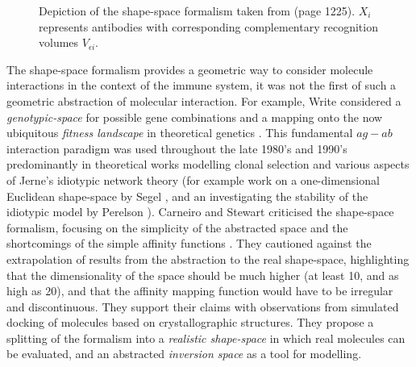 \begin{figure}[ht]
	\centering
	\caption{Depiction of the shape-space formalism taken from \cite{Perelson1997} (page 1225). $X_{i}$ represents antibodies with corresponding complementary recognition volumes $V_{\epsilon i}$.}
	\label{pic:theory:shapespace}
\end{figure}

The shape-space formalism provides a geometric way to consider molecule interactions in the context of the immune system, it was not the first of such a geometric abstraction of molecular interaction. For example, Write considered a \emph{genotypic-space} for possible gene combinations and a mapping onto the now ubiquitous \emph{fitness landscape} in theoretical genetics \cite{Wright1932}. 
This fundamental $ag-ab$ interaction paradigm was used throughout the late 1980's and 1990's predominantly in theoretical works modelling clonal selection and various aspects of Jerne's idiotypic network theory (for example work on a one-dimensional Euclidean shape-space by Segel \cite{Segel1988}, and an investigating the stability of the idiotypic model by Perelson \cite{Perelson1989}). Carneiro and Stewart criticised the shape-space formalism, focusing on the simplicity of the abstracted space and the shortcomings of the simple affinity functions \cite{Carneiro1994}. They cautioned against the extrapolation of results from the abstraction to the real shape-space, highlighting that the dimensionality of the space should be much higher (at least 10, and as high as 20), and that the affinity mapping function would have to be irregular and discontinuous. They support their claims with observations from simulated docking of molecules based on crystallographic structures. They propose a splitting of the formalism into a \emph{realistic shape-space} in which real molecules can be evaluated, and an abstracted \emph{inversion space} as a tool for modelling.

